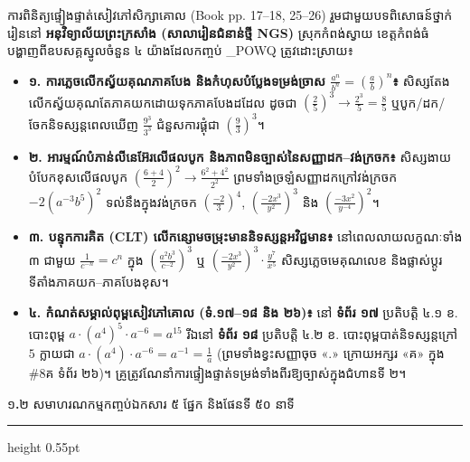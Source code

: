 \documentclass[a4paper,12pt]{article}
\newcommand{\en}[1]{{\TimesEn #1}}
\newcommand{\enbf}[1]{{\TimesEn\textbf{#1}}}
\newcommand{\subsectitle}[1]{{\muol\fontsize{11.5pt}{18.5pt}\selectfont #1}}
\newcommand{\subsec}[1]{%
  \Needspace{1.7cm}%
  \vspace{3pt}%
  \subsectitle{#1}\par%
  \vspace{-2pt}%
  {\color{black}\hrule height 0.55pt}%
  \vspace{3pt}%
}
\begin{document}
ការពិនិត្យផ្ទៀងផ្ទាត់សៀវភៅសិក្សាគោល (\en{Book pp. 17--18, 25--26}) រួមជាមួយបទពិសោធន៍ថ្នាក់រៀននៅ \textbf{អនុវិទ្យាល័យព្រះក្រសាំង (សាលារៀនជំនាន់ថ្មី \en{NGS})} ស្រុកកំពង់ស្វាយ ខេត្តកំពង់ធំ បង្ហាញពីឧបសគ្គស្នូលចំនួន ៤ យ៉ាងដែលកញ្ចប់ \en{\_POWQ} ត្រូវដោះស្រាយ៖
\begin{itemize}[leftmargin=0.65cm]
  \item \textbf{១. ការភ្លេចលើកស្វ័យគុណភាគបែង និងកំហុសបំប្លែងទម្រង់ច្រាស $\frac{a^n}{b^n} = \left(\frac{a}{b}\right)^n$៖} សិស្សតែងលើកស្វ័យគុណតែភាគយកដោយទុកភាគបែងដដែល ដូចជា $\left(\frac{2}{5}\right)^3 \to \frac{2^3}{5} = \frac{8}{5}$ ឬបូក/ដក/ចែកនិទស្សន្តពេលឃើញ $\frac{9^3}{3^3}$ ជំនួសការផ្គុំជា $\left(\frac{9}{3}\right)^3$។
  \item \textbf{២. អារម្មណ៍បំភាន់លីនេអ៊ែរលើផលបូក និងភាពមិនច្បាស់នៃសញ្ញាដក--វង់ក្រចក៖} សិស្សងាយបំបែកខុសលើផលបូក $\left(\frac{6+4}{2}\right)^2 \to \frac{6^2+4^2}{2^2}$ ព្រមទាំងច្រឡំសញ្ញាដកក្រៅវង់ក្រចក $-2(a^{-3}b^5)^2$ ទល់នឹងក្នុងវង់ក្រចក $\left(\frac{-2}{3}\right)^4$, $\left(\frac{-2x^3}{y^2}\right)^3$ និង $\left(\frac{-3x^2}{y^{-4}}\right)^2$។
  \item \textbf{៣. បន្ទុកការគិត \en{(CLT)} លើកន្សោមចម្រុះមាននិទស្សន្តអវិជ្ជមាន៖} នៅពេលលាយលក្ខណៈទាំង ៣ ជាមួយ $\frac{1}{c^{-n}} = c^n$ ក្នុង $\left(\frac{a^2b^3}{c^{-2}}\right)^3$ ឬ $\left(\frac{-2x^3}{y^2}\right)^3\cdot\frac{y^7}{x^5}$ សិស្សភ្លេចមេគុណលេខ និងផ្លាស់ប្ដូរទីតាំងភាគយក--ភាគបែងខុស។
  \item \textbf{៤. កំណត់សម្គាល់ពុម្ពសៀវភៅគោល (ទំ.១៧--១៨ និង ២៦)៖} នៅ \textbf{ទំព័រ ១៧} ប្រតិបត្តិ ៤.១ ខ. បោះពុម្ព $a\cdot(a^4)^5\cdot a^{-6} = a^{15}$ រីឯនៅ \textbf{ទំព័រ ១៨} ប្រតិបត្តិ ៤.២ ខ. បោះពុម្ពបាត់និទស្សន្តក្រៅ $5$ ក្លាយជា $a\cdot(a^4)\cdot a^{-6} = a^{-1} = \frac{1}{a}$ (ព្រមទាំងខ្វះសញ្ញាចុច «.» ក្រោយអក្សរ «គ» ក្នុង \en{\#8}គ ទំព័រ ២៦)។ គ្រូត្រូវណែនាំការផ្ទៀងផ្ទាត់ទម្រង់ទាំងពីរឱ្យច្បាស់ក្នុងជំហានទី ២។
\end{itemize}

\subsec{១\enbf{.}២ សមាហរណកម្មកញ្ចប់ឯកសារ ៥ ផ្នែក និងផែនទី ៥០ នាទី}
\end{document}

